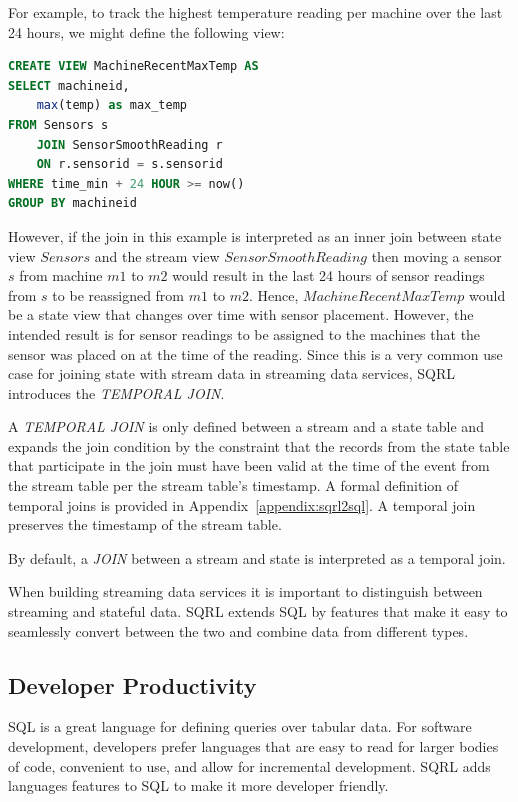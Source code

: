 \documentclass[	DIV=calc,%
							paper=letter,%
							fontsize=11pt,%
							twocolumn]{scrartcl}	 					%
\begin{document}
For example, to track the highest temperature reading per machine over the last 24 hours, we might define the following view:
\begin{lstlisting}[language=SQL]
CREATE VIEW MachineRecentMaxTemp AS
SELECT machineid,
    max(temp) as max_temp
FROM Sensors s
    JOIN SensorSmoothReading r
    ON r.sensorid = s.sensorid
WHERE time_min + 24 HOUR >= now()
GROUP BY machineid
\end{lstlisting}

However, if the join in this example is interpreted as an inner join between state view $Sensors$ and the stream view $SensorSmoothReading$ then moving a sensor $s$ from machine $m1$ to $m2$ would result in the last 24 hours of sensor readings from $s$ to be reassigned from $m1$ to $m2$. Hence, $MachineRecentMaxTemp$ would be a state view that changes over time with sensor placement. However, the intended result is for sensor readings to be assigned to the machines that the sensor was placed on at the time of the reading. Since this is a very common use case for joining state with stream data in streaming data services, SQRL introduces the \emph{TEMPORAL JOIN}.

A \emph{TEMPORAL JOIN} is only defined between a stream and a state table and expands the join condition by the constraint that the records from the state table that participate in the join must have been valid at the time of the event from the stream table per the stream table's timestamp. A formal definition of temporal joins is provided in Appendix~\ref{appendix:sqrl2sql}. A temporal join preserves the timestamp of the stream table.

By default, a \emph{JOIN} between a stream and state is interpreted as a temporal join.

When building streaming data services it is important to distinguish between streaming and stateful data. SQRL extends SQL by features that make it easy to seamlessly convert between the two and combine data from different types.

\subsection{Developer Productivity}

SQL is a great language for defining queries over tabular data. For software development, developers prefer languages that are easy to read for larger bodies of code, convenient to use, and allow for incremental development. SQRL adds languages features to SQL to make it more developer friendly.
\end{document}
